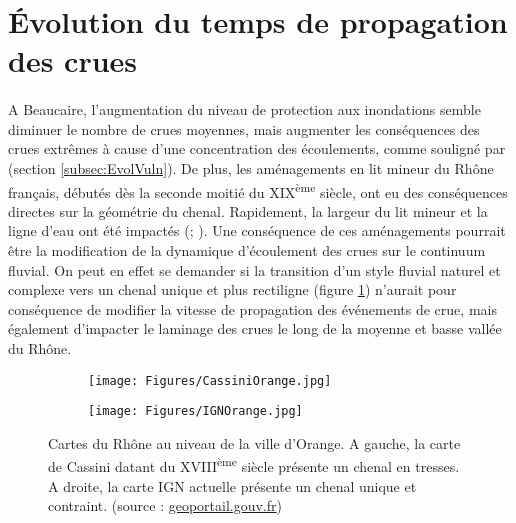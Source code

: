 \documentclass[11pt]{article}
\begin{document}
\FloatBarrier

\section{Évolution du temps de propagation des crues}

	\paragraph{} A Beaucaire, l'augmentation du niveau de protection aux inondations semble diminuer le nombre de crues moyennes, mais augmenter les conséquences des crues extrêmes à cause d'une concentration des écoulements, comme souligné par \citet{pichard_sept_2014} (section \ref{subsec:EvolVuln}). De plus, les aménagements en lit mineur du Rhône français, débutés dès la seconde moitié du XIX\textsuperscript{ème} siècle, ont eu des conséquences directes sur la géométrie du chenal. Rapidement, la largeur du lit mineur et la ligne d'eau ont été impactés (\cite{gaydou_schema_2013}; \citet{piegay_observatoire_2022}). Une conséquence de ces aménagements pourrait être la modification de la dynamique d'écoulement des crues sur le continuum fluvial. On peut en effet se demander si la transition d'un style fluvial naturel et complexe vers un chenal unique et plus rectiligne (figure \ref{fig:CartesChenal}) n'aurait pour conséquence de modifier la vitesse de propagation des événements de crue, mais également d'impacter le laminage des crues le long de la moyenne et basse vallée du Rhône. 
	
	\begin{figure}[h]
		\centering
		\begin{subfigure}{0.4\linewidth}
			\texttt{[image: Figures/CassiniOrange.jpg]}
		\end{subfigure}
		\begin{subfigure}{0.4\linewidth}
			\texttt{[image: Figures/IGNOrange.jpg]}
		\end{subfigure}
		\caption{Cartes du Rhône au niveau de la ville d'Orange. A gauche, la carte de Cassini datant du XVIII\textsuperscript{ème} siècle présente un chenal en tresses. A droite, la carte IGN actuelle présente un chenal unique et contraint. (source : \url{geoportail.gouv.fr})}
		\label{fig:CartesChenal}
	\end{figure}
	
	
\end{document}
